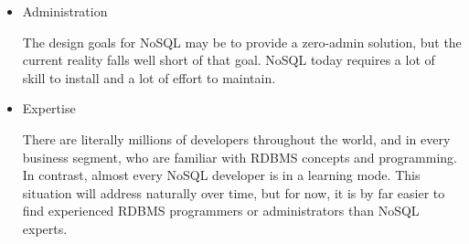 \begin{itemize}
\item Administration

The design goals for NoSQL may be to provide a zero-admin solution, but the current reality falls well short of that goal. NoSQL today requires a lot of skill to install and a lot of effort to maintain.

\item Expertise

There are literally millions of developers throughout the world, and in every business segment, who are familiar with RDBMS concepts and programming. In contrast, almost every NoSQL developer is in a learning mode. This situation will address naturally over time, but for now, it is by far easier to find experienced RDBMS programmers or administrators than NoSQL experts.

\end{itemize}




